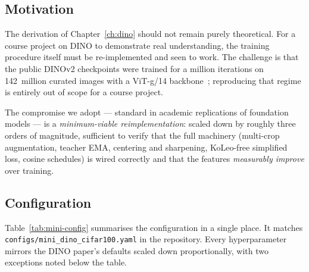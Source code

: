 \documentclass[11pt,a4paper]{article}
\begin{document}
\subsection{Motivation}

The derivation of Chapter~\ref{ch:dino} should not remain purely
theoretical. For a course project on DINO to demonstrate real
understanding, the training procedure itself must be re-implemented and
seen to work. The challenge is that the public DINOv2 checkpoints were
trained for a million iterations on 142~million curated images with a
ViT-g/14 backbone~\citep{oquab2024dinov2}; reproducing that regime is
entirely out of scope for a course project.

The compromise we adopt --- standard in academic replications of
foundation models --- is a \emph{minimum-viable reimplementation}:
scaled down by roughly three orders of magnitude, sufficient to verify
that the full machinery (multi-crop augmentation, teacher EMA, centering
and sharpening, KoLeo-free simplified loss, cosine schedules) is wired
correctly and that the features \emph{measurably improve} over training.

\subsection{Configuration}
\label{sec:mini-config}

Table~\ref{tab:mini-config} summarises the configuration in a single
place. It matches \texttt{configs/mini\_dino\_cifar100.yaml} in the
repository. Every hyperparameter mirrors the DINO paper's defaults
scaled down proportionally, with two exceptions noted below the table.
\end{document}
